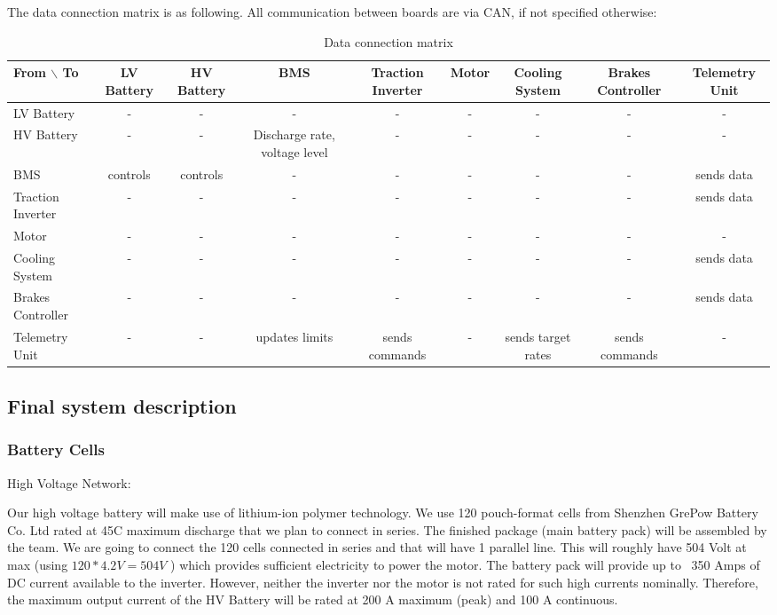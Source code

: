 The data connection matrix is as following. All communication between boards are via CAN, if not specified otherwise:

\begin{table}
    \centering
    \begin{adjustbox}{width=\textwidth,center}
    \begin{tabular}{|l|c|c|c|c|c|c|c|c|}
    \hline
    From $\backslash$ To & LV Battery & HV Battery & BMS & Traction Inverter & Motor & Cooling System & Brakes Controller & Telemetry Unit  \\
    \hline
    LV Battery & - & - & - & - & - & - & - & - \\
    HV Battery  & - & - & Discharge rate, voltage level & - & - & - & - & - \\
    BMS & controls & controls & - & - & - & - & - & sends data \\
    Traction Inverter & - & - & - & - & - & - & - & sends data \\
    Motor & - & - & - & - & - & - & - & - \\
    Cooling System & - & - & - & - & - & - & - & sends data \\
    Brakes Controller & - & - & - & - & - & - & - & sends data \\
    Telemetry Unit & - & - & updates limits & sends commands & - & sends target rates & sends commands & - \\
    \hline
    \end{tabular}
    \end{adjustbox}
    \caption{Data connection matrix}
    \label{data-connectivity-matrix}
\end{table}


\subsection{Final system description}
\subsubsection{Battery Cells}

High Voltage Network:

Our high voltage battery will make use of lithium-ion polymer technology. We use 120 pouch-format cells from Shenzhen GrePow Battery Co. Ltd rated at 45C maximum discharge that we plan to connect in series. 
The finished package (main battery pack) will be assembled by the team.
We are going to connect the 120 cells connected in series and that will have 1 parallel line. This will roughly have 504 Volt at max (using \(120 * 4.2V = 504 V \) ) 
which provides sufficient electricity to power the motor.
The battery pack will provide up to ~350 Amps of DC current available to the inverter. However, neither the inverter nor the motor is not rated for such high currents nominally. 
\newline
Therefore, the maximum output current of the HV Battery will be rated at 200 A maximum (peak) and 100 A continuous. 

